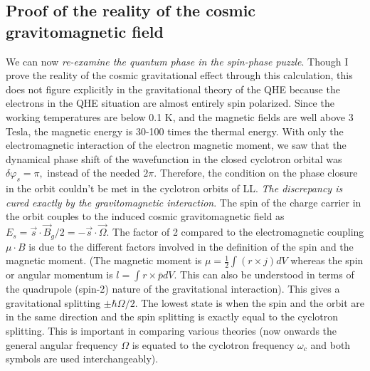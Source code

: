 \documentclass[aps,preprint,12pt,tightenlines]{revtex4}%
\begin{document}
\subsection{Proof of the reality of the cosmic gravitomagnetic field}

We can now \textit{re-examine the quantum phase in the spin-phase puzzle}.
Though I prove the reality of the cosmic gravitational effect through this
calculation, this does not figure explicitly in the gravitational theory of
the QHE because the electrons in the QHE situation are almost entirely spin
polarized. Since the working temperatures are below 0.1 K, and the magnetic
fields are well above 3 Tesla, the magnetic energy is 30-100 times the thermal
energy. With only the electromagnetic interaction of the electron magnetic
moment, we saw that the dynamical phase shift of the wavefunction in the
closed cyclotron orbital was $\delta\varphi_{s}=\pi,$ instead of the needed
$2\pi.$ Therefore, the condition on the phase closure in the orbit couldn't be
met in the cyclotron orbits of LL. \emph{The discrepancy is cured
exactly by the gravitomagnetic interaction}. The spin of the charge carrier in
the orbit couples to the induced cosmic gravitomagnetic field as $E_{s}%
=\vec{s}\cdot\vec{B}_{g}/2=-\vec{s}\cdot\vec{\Omega}$. The factor of 2
compared to the electromagnetic coupling $\mu\cdot B$ is due to the
different factors involved in the definition of the spin and the magnetic
moment. (The magnetic moment is $\mu=\frac{1}{2}\int\left(  r\times j\right)
dV$ whereas the spin or angular momentum is $l=\int r\times\bar{p}dV$. This
can also be understood in terms of the quadrupole (spin-2) nature of the
gravitational interaction). This gives a gravitational splitting $\pm
\hbar\Omega/2$. The lowest state is when the spin and the orbit are in the
same direction and the spin splitting is exactly equal to the cyclotron
splitting. This is important in comparing various theories (now onwards the
general angular frequency $\Omega$ is equated to the cyclotron frequency
$\omega_{c}$ and both symbols are used interchangeably).
\end{document}
